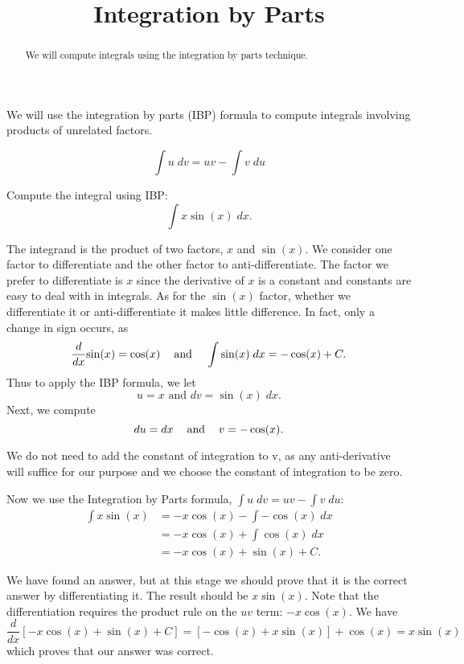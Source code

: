 \documentclass{ximera}
\title{Integration by Parts}
\begin{document}
\begin{abstract}
We will compute integrals using the integration by parts technique.
\end{abstract}

\maketitle


We will use the integration by parts (IBP) formula to compute integrals involving products of unrelated factors.


\begin{theorem}
\[
\int u \; dv = uv - \int v \; du
\]
\end{theorem}






\begin{example} %
Compute the integral using IBP:
  \[
  \int x\sin(x) \;dx.
  \]
  
  The integrand is the product of two factors, $x$ and $\sin(x)$.  We consider one factor to differentiate and the other factor to anti-differentiate.
  The factor we prefer to differentiate is $x$ since the derivative of $x$ is a constant and constants are easy to deal with in integrals.
  As for the $\sin(x)$ factor, whether we differentiate it or anti-differentiate it makes little difference.  In fact, only a change in sign occurs,
  as 
  \[\frac{d}{dx}{\sin(x)} = \cos(x)    \text{ \;\;   and \;\;   }   \int \sin(x) \;dx = -\cos(x) + C.\]
  Thus to apply the IBP formula, we let
  \[u=x \text{  and  }  dv = \sin(x) \;dx.\]
  Next, we compute
  \[du = dx  \text{  \;\;  and \;\;   }  v = -\cos(x).\]
  \begin{remark} 
  We do not need to add the constant of integration to v, as any anti-derivative will suffice 
  for our purpose and we choose the constant of integration to be zero.
  \end{remark}
  Now we use the Integration by Parts formula, $\int u\;dv = uv-\int v\; du$:
  \begin{align*}
  \int x\sin(x) &= -x\cos(x) - \int -\cos(x) \;dx\\
                &= -x\cos(x) + \int \cos(x) \;dx\\
                &= -x\cos(x) + \sin(x) + C.
 \end{align*}
 
  We have found an answer, but at this stage we should prove that it is the correct answer by differentiating it.  The result should be $x\sin(x)$.
  Note that the differentiation requires the product rule on the $uv$ term: $-x\cos(x)$.
  We have
  \[
  \frac{d}{dx}{\left[-x\cos(x) + \sin(x) + C\right]} = [-\cos(x) + x\sin(x)] + \cos(x) = x\sin(x)
  \]
  which proves that our answer was correct.
  
    
\end{example}
\end{document}
